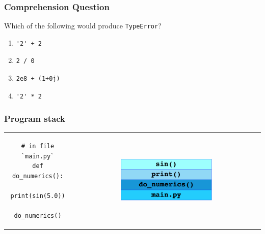 \documentclass[11pt]{beamer}
\begin{document}
\begin{frame}[fragile]
  \frametitle{Comprehension Question}
  \Enlarge

  Which of the following would produce \texttt{TypeError}?

  \begin{enumerate}[label=\Alph*]
  \item  \begin{verbatim}'2' + 2\end{verbatim}
  \item  \begin{verbatim}2 / 0\end{verbatim}
  \item  \begin{verbatim}2e8 + (1+0j)\end{verbatim}
  \item  \begin{verbatim}'2' * 2\end{verbatim}
  \end{enumerate}
\end{frame}

\begin{frame}[fragile]
  \frametitle{Program stack}

  \begin{tabular}{cc}
    \begin{minipage}{2in}
    \begin{verbatim}
# in file `main.py`
def do_numerics():
    print(sin(5.0))

do_numerics()
    \end{verbatim}
    \end{minipage}
    &
    \includegraphics[width=0.5\textwidth]{./img/stack.png}
    \\
  \end{tabular}
\end{frame}

\end{document}
